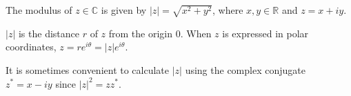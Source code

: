 The modulus of $z \in \mathbb{C}$ is given by
  $|z|=\sqrt{x^{2}+y^{2}}$, where $x,y \in \mathbb{R}$ and
  $z=x+iy$. 
\par
  $|z|$ is the distance $r$ of $z$ from the origin $0$. When $z$
  is expressed in polar coordinates, $z = re^{i\theta} =
  |z|e^{i\theta}$.
\par
  It is sometimes convenient to calculate $|z|$ using the complex
  conjugate $z^{*}= x - iy$ since $|z|^2 = zz^*$.